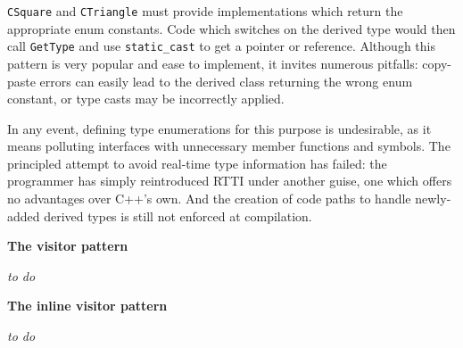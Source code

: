 \documentclass[10pt,a4paper,twocolumn]{article}
\renewcommand\section[1]{
    \begin{minipage}[c]{0.94\linewidth}
    \large \raggedright \sffamily \textbf{#1}
    \end{minipage}
}
\newcommand\mycode[1]{{\small\texttt{#1}}}
\begin{document}
\mycode{CSquare} and \mycode{CTriangle} must provide implementations which return the appropriate enum constants. Code which switches on the derived type would then call \mycode{GetType} and use \mycode{static\_cast} to get a pointer or reference. Although this pattern is very popular and ease to implement, it invites numerous pitfalls: copy-paste errors can easily lead to the derived class returning the wrong enum constant, or type casts may be incorrectly applied.

In any event, defining type enumerations for this purpose is undesirable, as it means polluting interfaces with unnecessary member functions and symbols. The principled attempt to avoid real-time type information has failed: the programmer has simply reintroduced RTTI under another guise, one which offers no advantages over C++'s own. And the creation of code paths to handle newly-added derived types is still not enforced at compilation.

\section{The visitor pattern}

\textit{to do}


\section{The inline visitor pattern}

\textit{to do}
\end{document}

